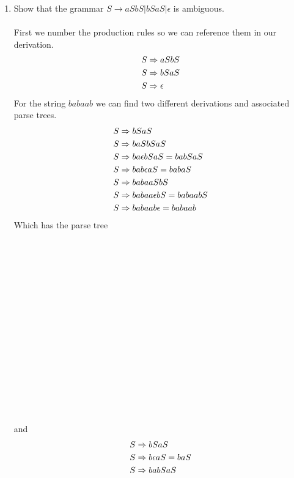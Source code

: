 \documentclass[10pt,a4paper,final]{article}
\begin{document}
\begin{enumerate}
\item %
Show that the grammar $S \rightarrow aSbS|bSaS|\epsilon$ is ambiguous. \\
\\
First we number the production rules so we can reference them in our derivation.
\begin{align}
  \setcounter{equation}{0}
  S &\Rightarrow aSbS \\ %
  S &\Rightarrow bSaS \\ %
  S &\Rightarrow \epsilon %
\end{align}
For the string $babaab$ we can find two different derivations and associated parse trees.
\begin{align}
  \setcounter{equation}{1}
  S &\Rightarrow bSaS \\
  \setcounter{equation}{0}
  S &\Rightarrow b aSbS aS \\
  \setcounter{equation}{2}
  S &\Rightarrow b a \epsilon bS aS = b abS aS\\
  \setcounter{equation}{2}
  S &\Rightarrow b ab \epsilon aS = b ab aS \\
  \setcounter{equation}{0}
  S &\Rightarrow baba aSbS \\
  \setcounter{equation}{2}
  S &\Rightarrow baba a \epsilon bS = babaabS\\
  \setcounter{equation}{2}
  S &\Rightarrow babaab \epsilon = babaab
\end{align}
Which has the parse tree
\\ \\ \\ \\ \\ \\ \\ \\ \\ \\ \\ \\ \\ \\ \\ \\ \\
and
\begin{align}
  \setcounter{equation}{1}
  S &\Rightarrow bSaS \\
  \setcounter{equation}{2}
  S &\Rightarrow b \epsilon aS = baS \\
  \setcounter{equation}{1}
  S &\Rightarrow ba bSaS \\

\end{align}
\end{enumerate}
\end{document}
